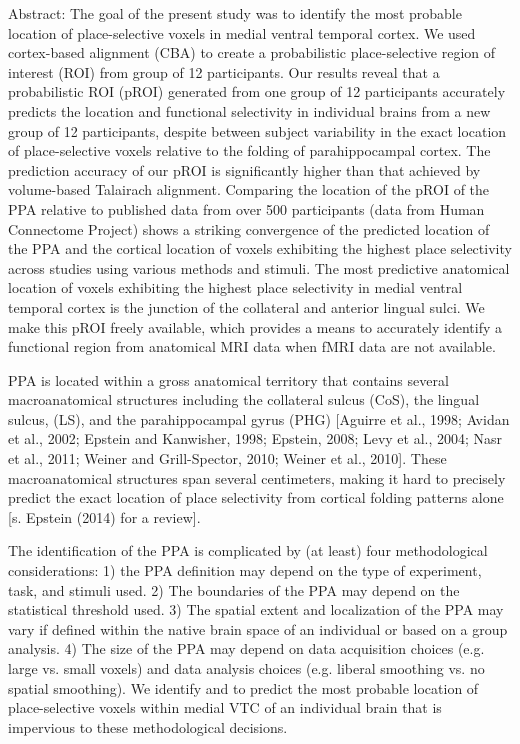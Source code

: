 
Abstract: The goal of the present study was to identify the most probable
location of place-selective voxels in medial ventral temporal cortex.
%
We used cortex-based alignment (CBA) to create a probabilistic
place-selective region of interest (ROI) from group of 12 participants.
%
Our results reveal that a probabilistic ROI (pROI) generated from one group of
12 participants accurately predicts the location and functional selectivity in
individual brains from a new group of 12 participants, despite between subject
variability in the exact location of place-selective voxels relative to the
folding of parahippocampal cortex.
%
The prediction accuracy of our pROI is significantly higher than
that achieved by volume-based Talairach alignment.
%
Comparing the location of the pROI of the PPA relative to published data from
over 500 participants (data from Human Connectome Project) shows a
striking convergence of the predicted location of the PPA and the cortical
location of voxels exhibiting the highest place selectivity across studies using
various methods and stimuli.
%
The most predictive anatomical location of voxels exhibiting the
highest place selectivity in medial ventral temporal cortex is the junction of
the collateral and anterior lingual sulci.
%
We make this pROI freely available, which provides a means to
accurately identify a functional region from anatomical MRI data when fMRI data
are not available.
%

PPA is located within a gross anatomical territory that contains several
macroanatomical structures including the collateral sulcus (CoS), the lingual
sulcus, (LS), and the parahippocampal gyrus (PHG) [Aguirre et al., 1998; Avidan
et al., 2002; Epstein and Kanwisher, 1998; Epstein, 2008; Levy et al., 2004;
Nasr et al., 2011; Weiner and Grill-Spector, 2010; Weiner et al., 2010].
%
These macroanatomical structures span several centimeters, making it hard to
precisely predict the exact location of place selectivity from cortical folding
patterns alone [s. Epstein (2014) for a review].
%

The identification of the PPA is complicated by (at least) four methodological
considerations:
%
1) the PPA definition may depend on the type of experiment, task, and stimuli
used.
%
2) The boundaries of the PPA may depend on the statistical threshold used.
%
3) The spatial extent and localization of the PPA may vary if defined within the
native brain space of an individual or based on a group analysis.
%
4) The size of the PPA may depend on data acquisition choices (e.g. large vs.
small voxels) and data analysis choices (e.g. liberal smoothing vs. no spatial
smoothing).
%
We identify and to predict the most probable location of place-selective voxels
within medial VTC of an individual brain that is impervious to these
methodological decisions.

